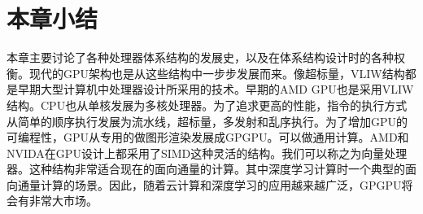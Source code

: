 \section{本章小结}
本章主要讨论了各种处理器体系结构的发展史，以及在体系结构设计时的各种权衡。现代的GPU架构也是从这些结构中一步步发展而来。像超标量，VLIW结构都是早期大型计算机中处理器设计所采用的技术。早期的AMD GPU也是采用VLIW结构。CPU也从单核发展为多核处理器。为了追求更高的性能，指令的执行方式从简单的顺序执行发展为流水线，超标量，多发射和乱序执行。为了增加GPU的可编程性，GPU从专用的做图形渲染发展成GPGPU。可以做通用计算。AMD和NVIDA在GPU设计上都采用了SIMD这种灵活的结构。我们可以称之为向量处理器。这种结构非常适合现在的面向通量的计算。其中深度学习计算时一个典型的面向通量计算的场景。因此，随着云计算和深度学习的应用越来越广泛，GPGPU将会有非常大市场。

